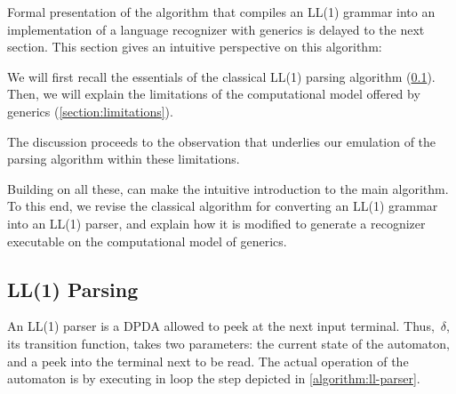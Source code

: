 Formal presentation of the algorithm that compiles an LL(1) grammar into an implementation of a
  language recognizer with \Java generics
  is delayed to the next section.
This section gives an intuitive perspective on this algorithm:

We will first recall the essentials of the classical LL(1) parsing algorithm (\cref{section:essentials}).
Then, we will explain the limitations of the computational model
offered by \Java generics (\cref{section:limitations}).

The discussion proceeds to the observation
  that underlies our emulation of the parsing algorithm
  within these limitations.

Building on all these,  can
  make the intuitive introduction to the main algorithm.
To this end, we revise the classical algorithm for converting
  an LL(1) grammar into an LL(1) parser, and explain
  how it is modified to generate a recognizer executable
  on the computational model of \Java generics.

\subsection{LL(1) Parsing}
\label{section:essentials}
An LL(1) parser is a DPDA allowed to peek at the next input terminal.
Thus,~$δ$, its transition function, takes two parameters: the current state of
the automaton, and a peek into the terminal next to be read.
The actual operation of the automaton
  is by executing in loop the step
  depicted in \cref{algorithm:ll-parser}.

